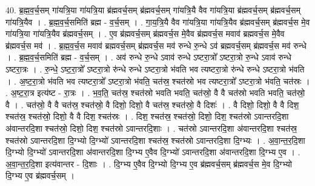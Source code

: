 \documentclass[17pt]{extarticle}
\begin{document}
40. ब्र॒ह्म॒व॒र्च॒सम् गा॑यत्रि॒या गा॑यत्रि॒या ब्र॑ह्मवर्च॒सम् ब्र॑ह्मवर्च॒सम् गा॑यत्रि॒यै वैव गा॑यत्रि॒या ब्र॑ह्मवर्च॒सम् ब्र॑ह्मवर्च॒सम् गा॑यत्रि॒यैव । . ब्र॒ह्म॒व॒र्च॒समिति॑ ब्रह्म - व॒र्च॒सम् । . गा॒य॒त्रि॒यै वैव गा॑यत्रि॒या गा॑यत्रि॒यैव ब्र॑ह्मवर्च॒सम् ब्र॑ह्मवर्च॒स मे॒व गा॑यत्रि॒या गा॑यत्रि॒यैव ब्र॑ह्मवर्च॒सम् । . ए॒व ब्र॑ह्मवर्च॒सम् ब्र॑ह्मवर्च॒स मे॒वैव ब्र॑ह्मवर्च॒स मवाव॑ ब्रह्मवर्च॒स मे॒वैव ब्र॑ह्मवर्च॒स मव॑ । . ब्र॒ह्म॒व॒र्च॒स मवाव॑ ब्रह्मवर्च॒सम् ब्र॑ह्मवर्च॒स मव॑ रुन्धे रु॒न्धे ऽव॑ ब्रह्मवर्च॒सम् ब्र॑ह्मवर्च॒स मव॑ रुन्धे । . ब्र॒ह्म॒व॒र्च॒समिति॑ ब्रह्म - व॒र्च॒सम् । . अव॑ रुन्धे रु॒न्धे ऽवाव॑ रुन्धे ऽष्टरा॒त्रो᳚ ऽष्टरा॒त्रो रु॒न्धे ऽवाव॑ रुन्धे ऽष्टरा॒त्रः । . रु॒न्धे॒ ऽष्ट॒रा॒त्रो᳚ ऽष्टरा॒त्रो रु॑न्धे रुन्धे ऽष्टरा॒त्रो भ॑वति भव त्यष्टरा॒त्रो रु॑न्धे रुन्धे ऽष्टरा॒त्रो भ॑वति । . अ॒ष्ट॒रा॒त्रो भ॑वति भव त्यष्टरा॒त्रो᳚ ऽष्टरा॒त्रो भ॑वति॒ चत॑स्र॒ श्चत॑स्रो भव त्यष्टरा॒त्रो᳚ ऽष्टरा॒त्रो भ॑वति॒ चत॑स्रः । . अ॒ष्ट॒रा॒त्र इत्य॑ष्ट - रा॒त्रः । . भ॒व॒ति॒ चत॑स्र॒ श्चत॑स्रो भवति भवति॒ चत॑स्रो॒ वै वै चत॑स्रो भवति भवति॒ चत॑स्रो॒ वै । . चत॑स्रो॒ वै वै चत॑स्र॒ श्चत॑स्रो॒ वै दिशो॒ दिशो॒ वै चत॑स्र॒ श्चत॑स्रो॒ वै दिशः॑ । . वै दिशो॒ दिशो॒ वै वै दिश॒ श्चत॑स्र॒ श्चत॑स्रो॒ दिशो॒ वै वै दिश॒ श्चत॑स्रः । . दिश॒ श्चत॑स्र॒ श्चत॑स्रो॒ दिशो॒ दिश॒ श्चत॑स्रो ऽवान्तरदि॒शा अ॑वान्तरदि॒शा श्चत॑स्रो॒ दिशो॒ दिश॒ श्चत॑स्रो ऽवान्तरदि॒शाः । . चत॑स्रो ऽवान्तरदि॒शा अ॑वान्तरदि॒शा श्चत॑स्र॒ श्चत॑स्रो ऽवान्तरदि॒शा दि॒ग्भ्यो दि॒ग्भ्यो॑ ऽवान्तरदि॒शा श्चत॑स्र॒ श्चत॑स्रो ऽवान्तरदि॒शा दि॒ग्भ्यः । . अ॒वा॒न्त॒र॒दि॒शा दि॒ग्भ्यो दि॒ग्भ्यो॑ ऽवान्तरदि॒शा अ॑वान्तरदि॒शा दि॒ग्भ्य ए॒वैव दि॒ग्भ्यो॑ ऽवान्तरदि॒शा अ॑वान्तरदि॒शा दि॒ग्भ्य ए॒व । . अ॒वा॒न्त॒र॒दि॒शा इत्य॑वान्तर - दि॒शाः । . दि॒ग्भ्य ए॒वैव दि॒ग्भ्यो दि॒ग्भ्य ए॒व ब्र॑ह्मवर्च॒सम् ब्र॑ह्मवर्च॒स मे॒व दि॒ग्भ्यो दि॒ग्भ्य ए॒व ब्र॑ह्मवर्च॒सम् । \newline
\end{document}
